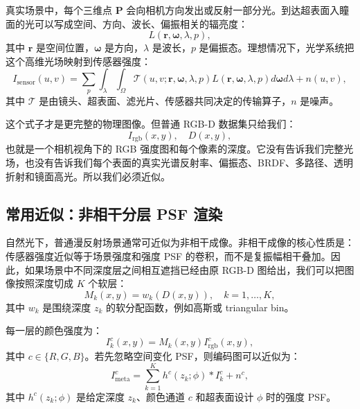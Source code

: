 \documentclass[11pt,a4paper,fontset=none]{ctexart}
\begin{document}
真实场景中，每个三维点 $\bm P$ 会向相机方向发出或反射一部分光。到达超表面入瞳面的光可以写成空间、方向、波长、偏振相关的辐亮度：
\begin{equation}
  L(\bm r, \bm \omega, \lambda, p),
\end{equation}
其中 $\bm r$ 是空间位置，$\bm \omega$ 是方向，$\lambda$ 是波长，$p$ 是偏振态。理想情况下，光学系统把这个高维光场映射到传感器强度：
\begin{equation}
  I_{\mathrm{sensor}}(u,v)
  =
  \sum_p
  \int_\lambda
  \int_{\Omega}
  \mathcal T(u,v;\bm r,\bm \omega,\lambda,p)
  L(\bm r,\bm \omega,\lambda,p)
  d\bm\omega d\lambda
  + n(u,v),
\end{equation}
其中 $\mathcal T$ 是由镜头、超表面、滤光片、传感器共同决定的传输算子，$n$ 是噪声。

这个式子才是更完整的物理图像。但普通 RGB-D 数据集只给我们：
\begin{equation}
  I_{\mathrm{rgb}}(x,y),\quad D(x,y),
\end{equation}
也就是一个相机视角下的 RGB 强度图和每个像素的深度。它没有告诉我们完整光场，也没有告诉我们每个表面的真实光谱反射率、偏振态、BRDF、多路径、透明折射和镜面高光。所以我们必须近似。

\subsection{常用近似：非相干分层 PSF 渲染}

自然光下，普通漫反射场景通常可近似为非相干成像。非相干成像的核心性质是：传感器强度近似等于场景强度和强度 PSF 的卷积，而不是复振幅相干叠加。因此，如果场景中不同深度层之间相互遮挡已经由原 RGB-D 图给出，我们可以把图像按照深度切成 $K$ 个软层：
\begin{equation}
  M_k(x,y)
  =
  w_k(D(x,y)),
  \quad k=1,\ldots,K,
\end{equation}
其中 $w_k$ 是围绕深度 $z_k$ 的软分配函数，例如高斯或 triangular bin。

每一层的颜色强度为：
\begin{equation}
  I_k^c(x,y)=M_k(x,y) I_{\mathrm{rgb}}^c(x,y),
\end{equation}
其中 $c\in\{R,G,B\}$。若先忽略空间变化 PSF，则编码图可以近似为：
\begin{equation}
  I_{\mathrm{meta}}^c
  =
  \sum_{k=1}^{K}
  h^c(z_k;\phi)
  *
  I_k^c
  +
  n^c,
  \label{eq:layered_simple}
\end{equation}
其中 $h^c(z_k;\phi)$ 是给定深度 $z_k$、颜色通道 $c$ 和超表面设计 $\phi$ 时的强度 PSF。
\end{document}
